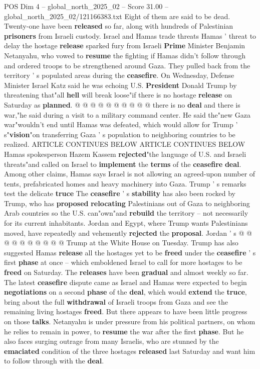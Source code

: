 \begin{textsample}{POS Dim 4 – global\_north\_2025\_02 – Score 31.00 – global\_north\_2025\_02/121166383.txt}
Eight of them are said to be dead.
Twenty-one have been \textbf{released} so far, along with hundreds of Palestinian \textbf{prisoners} from Israeli custody.
Israel and Hamas trade threats Hamas ' threat to delay the hostage \textbf{release} sparked fury from Israeli \textbf{Prime} Minister Benjamin Netanyahu, who vowed to \textbf{resume} the fighting if Hamas didn't follow through and ordered troops to be strengthened around Gaza.
They pulled back from the territory ' s populated areas during the \textbf{ceasefire}.
On Wednesday, Defense Minister Israel Katz said he was echoing U.S. \textbf{President} Donald Trump by threatening that"all \textbf{hell} will break loose"if there is no hostage \textbf{release} on Saturday as \textbf{planned}. @ @ @ @ @ @ @ @ @ @ there is no \textbf{deal} and there is war,"he said during a visit to a military command center.
He said the"new Gaza war"wouldn't end until Hamas was defeated, which would allow for Trump ' s"\textbf{vision}"on transferring Gaza ' s population to neighboring countries to be realized.
ARTICLE CONTINUES BELOW ARTICLE CONTINUES BELOW Hamas spokesperson Hazem Kassem \textbf{rejected}"the language of U.S. and Israeli threats"and called on Israel to \textbf{implement} the \textbf{terms} of the \textbf{ceasefire} \textbf{deal}.
Among other claims, Hamas says Israel is not allowing an agreed-upon number of tents, prefabricated homes and heavy machinery into Gaza.
Trump ' s remarks test the delicate \textbf{truce} The \textbf{ceasefire} ' s \textbf{stability} has also been rocked by Trump, who has \textbf{proposed} \textbf{relocating} Palestinians out of Gaza to neighboring Arab countries so the U.S. can"own"and \textbf{rebuild} the territory -- not necessarily for its current inhabitants.
Jordan and Egypt, where Trump wants Palestinians moved, have repeatedly and vehemently \textbf{rejected} the \textbf{proposal}.
Jordan ' s @ @ @ @ @ @ @ @ @ @ Trump at the White House on Tuesday.
Trump has also suggested Hamas \textbf{release} all the hostages yet to be \textbf{freed} under the \textbf{ceasefire} ' s first \textbf{phase} at once -- which emboldened Israel to call for more hostages to be \textbf{freed} on Saturday.
The \textbf{releases} have been \textbf{gradual} and almost weekly so far.
The latest \textbf{ceasefire} dispute came as Israel and Hamas were expected to begin \textbf{negotiations} on a second \textbf{phase} of the \textbf{deal}, which would \textbf{extend} the \textbf{truce}, bring about the full \textbf{withdrawal} of Israeli troops from Gaza and see the remaining living hostages \textbf{freed}.
But there appears to have been little progress on those \textbf{talks}.
Netanyahu is under pressure from his political partners, on whom he relies to remain in power, to \textbf{resume} the war after the first \textbf{phase}.
But he also faces surging outrage from many Israelis, who are stunned by the \textbf{emaciated} condition of the three hostages \textbf{released} last Saturday and want him to follow through with the \textbf{deal}.


\end{textsample}
